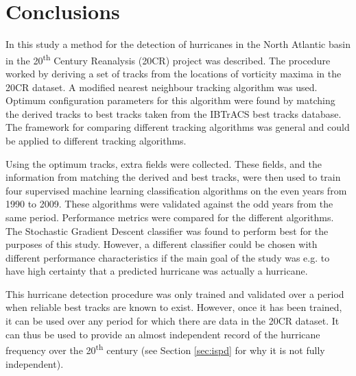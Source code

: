 \documentclass[pdftex,12pt,a4paper]{report}
\newcommand{\ts}{\textsuperscript}
\begin{document}
\chapter{Conclusions}
\label{chap:conclusion}

In this study a method for the detection of hurricanes in the North Atlantic basin in the 20\ts{th}
Century Reanalysis (20CR) project was described. The procedure worked by deriving a set of tracks
from the locations of vorticity maxima in the 20CR dataset. A modified nearest neighbour tracking
algorithm was used. Optimum configuration parameters for this algorithm were found by matching the
derived tracks to best tracks taken from the IBTrACS best tracks database. The framework for
comparing different tracking algorithms was general and could be applied to different tracking
algorithms.

Using the optimum tracks, extra fields were collected. These fields, and the information from
matching the derived and best tracks, were then used to train four supervised machine learning
classification algorithms on the even years from 1990 to 2009. These algorithms were
validated against the odd years from the same period. Performance metrics were compared for the
different algorithms. The Stochastic Gradient Descent classifier was found to perform best for the
purposes of this study. However, a different classifier could be chosen with different performance
characteristics if the main goal of the study was e.g. to have high certainty that a predicted
hurricane was actually a hurricane.

This hurricane detection procedure was only trained and validated over a period when reliable best
tracks are known to exist. However, once it has been trained, it can be used over any period for
which there are data in the 20CR dataset. It can thus be used to provide an almost independent
record of the hurricane frequency over the 20\ts{th} century (see Section \ref{sec:ispd} for why it
is not fully independent).
\end{document}
